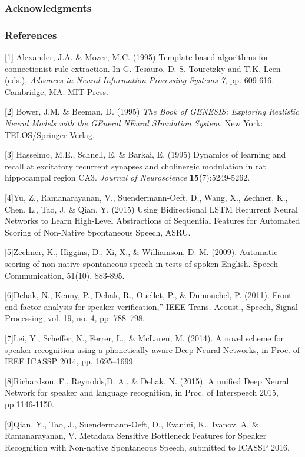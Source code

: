 \documentclass{article} %
\begin{document}


\subsubsection*{Acknowledgments}


\subsubsection*{References}


\small{
[1] Alexander, J.A. \& Mozer, M.C. (1995) Template-based algorithms
for connectionist rule extraction. In G. Tesauro, D. S. Touretzky
and T.K. Leen (eds.), {\it Advances in Neural Information Processing
Systems 7}, pp. 609-616. Cambridge, MA: MIT Press.

[2] Bower, J.M. \& Beeman, D. (1995) {\it The Book of GENESIS: Exploring
Realistic Neural Models with the GEneral NEural SImulation System.}
New York: TELOS/Springer-Verlag.

[3] Hasselmo, M.E., Schnell, E. \& Barkai, E. (1995) Dynamics of learning
and recall at excitatory recurrent synapses and cholinergic modulation
in rat hippocampal region CA3. {\it Journal of Neuroscience}
{\bf 15}(7):5249-5262.
}


[4]Yu, Z., Ramanarayanan, V., Suendermann-Oeft, D., Wang, X., Zechner, K., Chen, L., Tao, J. \& Qian, Y. (2015) Using Bidirectional LSTM Recurrent Neural Networks to Learn High-Level Abstractions of Sequential Features for Automated Scoring of Non-Native Spontaneous Speech, ASRU.

[5]Zechner, K., Higgins, D., Xi, X., \& Williamson, D. M. (2009). Automatic scoring of non-native spontaneous speech in tests of spoken English. Speech Communication, 51(10), 883-895.

[6]Dehak, N., Kenny, P., Dehak, R., Ouellet, P., \& Dumouchel, P. (2011). Front end factor analysis for speaker verification,”
IEEE Trans. Acoust., Speech, Signal Processing, vol. 19, no. 4, pp. 788–798.

[7]Lei, Y., Scheffer, N., Ferrer, L., \& McLaren, M. (2014). A novel scheme for speaker recognition using a phonetically-aware Deep Neural Networks, in Proc. of IEEE ICASSP 2014, pp. 1695–1699.

[8]Richardson, F., Reynolds,D. A., \& Dehak, N. (2015).  A unified Deep Neural Network for speaker and language recognition, in Proc. of Interspeech 2015, pp.1146-1150.

[9]Qian, Y., Tao, J., Suendermann-Oeft, D.,  Evanini, K., Ivanov, A. \& Ramanarayanan, V.  Metadata Sensitive Bottleneck Features for Speaker Recognition with Non-native Spontaneous Speech, submitted to ICASSP 2016.  
\end{document}
